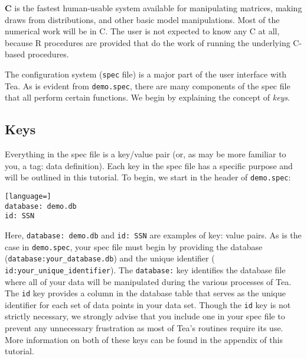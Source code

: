 \documentclass{article}
\begin{document}
{\bf C} is the fastest human-usable system available for manipulating matrices, making
draws from distributions, and other basic model manipulations. Most of the numerical
work will be in C. The user is not expected to know any C at all, because R procedures
are provided that do the work of running the underlying C-based procedures.




%


The configuration system ({\tt spec} file) is a major part of the user interface with Tea. 
As is evident from {\tt demo.spec}, there are many components of the spec file that all 
perform certain functions. We begin by explaining the concept of \textit{keys}.

\subsection{Keys}
Everything in the spec file is a key/value pair (or, as may be more familiar to 
you, a tag: data definition). Each key in the spec file has a specific purpose and 
will be outlined in this tutorial.
To begin, we start in the header of {\tt demo.spec}:

\begin{lstlisting}[language=]
database: demo.db
id: SSN
\end{lstlisting}

Here, {\tt database: demo.db} and {\tt id: SSN} are examples of key: value pairs.
As is the case in {\tt demo.spec}, your spec file must begin by providing the
database ({\tt database:your\_database.db}) and the unique identifier ({\tt
id:your\_unique\_identifier}). The {\tt database:} key identifies the database file
where all of your data will be manipulated during the various processes of Tea.
The {\tt id} key provides a column in the database table that serves as the unique
identifier for each set of data points in your data set. Though the {\tt id} key is
not strictly necessary, we strongly advise that you include one in your spec file to
prevent any unnecessary frustration as most of Tea's routines require its use. More
information on both of these keys can be found in the appendix of this tutorial.\\
\end{document}
